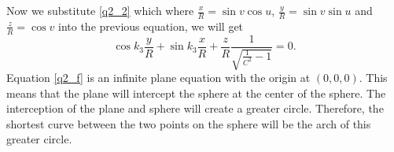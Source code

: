 Now we substitute \ref{q2_2} which where $\frac{x}{R} = \sin v \cos u$, $\frac{y}{R} = \sin v \sin u$ and $\frac{z}{R} = \cos v$ into the previous equation, we will get
\begin{equation}\label{q2_f}
\cos k_3 \frac{y}{R} + \sin k_3 \frac{x}{R} + \frac{z}{R} \frac{1}{\sqrt{\frac{1}{C^2}-1}} = 0.
\end{equation}
Equation \ref{q2_f} is an infinite plane equation with the origin at $(0,0,0)$. This means that the plane will intercept the sphere at the center of the sphere. The interception of the plane and sphere will create a greater circle. Therefore, the shortest curve between the two points on the sphere will be the arch of this greater circle.